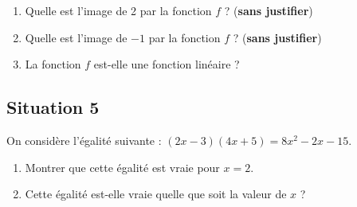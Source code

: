 \documentclass[exercice,a4]{thedocument}%
\begin{document}
\medskip

\begin{enumerate}
\item Quelle est l'image de 2 par la fonction $f$ ? (\textbf{sans justifier})
\item Quelle est l'image de $- 1$ par la fonction $f$ ? (\textbf{sans justifier})
\item La fonction $f$ est-elle une fonction linéaire ?
\end{enumerate}

\subsection*{Situation 5}

On considère l'égalité suivante : $(2x - 3)(4x + 5) = 8x^2 - 2x - 15$.

\begin{enumerate}
\item Montrer que cette égalité est vraie pour $x = 2$.
\item Cette égalité est-elle vraie quelle que soit la valeur de $x$ ?
\end{enumerate}
\showthesource
\end{document}
